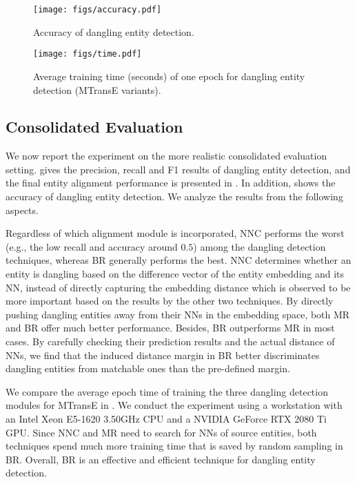 \begin{figure}[t]
	\centering
	\texttt{[image: figs/accuracy.pdf]}
	\caption{Accuracy of dangling entity detection.}
	\label{fig:accuracy}
\end{figure}

\begin{figure}[t]
	\centering
	\texttt{[image: figs/time.pdf]}
	\caption{Average training time (seconds) of one epoch for dangling entity detection (MTransE variants).}
	\label{fig:time}
\end{figure}

\subsection{Consolidated Evaluation}\label{sec:consolidated}
We now report the experiment on the more realistic consolidated evaluation setting.
 gives the precision, recall and F1 results of dangling entity detection, and the final entity alignment performance is presented in . 
In addition,  shows the accuracy of dangling entity detection.
We analyze the results from the following aspects.

Regardless of which alignment module is incorporated,
NNC performs the worst (e.g., the low recall and accuracy around $0.5$) 
among the dangling detection techniques, whereas BR generally performs the best. 
NNC determines whether an entity is dangling based on the difference vector of the entity embedding and its NN, instead of directly capturing the embedding distance which is observed to be more important based on the results by the other two techniques.
By directly pushing dangling entities away from their NNs in the embedding space, both MR and BR offer much better performance. 
Besides, BR outperforms MR in most cases. 
By carefully checking their prediction results and the actual distance of NNs, we find that the induced distance margin in BR better discriminates dangling entities from matchable ones than the pre-defined margin.

We compare the average epoch time of training the three dangling detection modules for MTransE in . We conduct the experiment using a workstation with an Intel Xeon E5-1620 3.50GHz CPU and a NVIDIA GeForce RTX 2080 Ti GPU. 
Since NNC and MR need to search for NNs of source entities, both techniques spend much more training time 
that is saved by random sampling in BR. Overall, BR is an effective and efficient technique for dangling entity detection.

